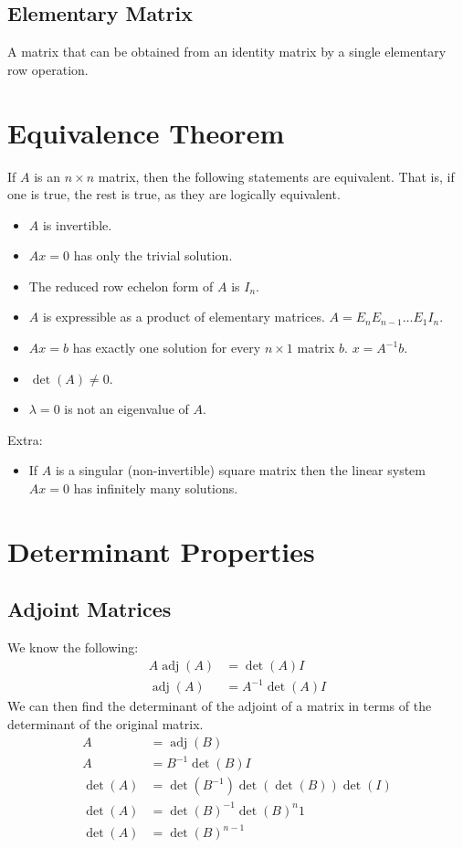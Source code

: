 \documentclass[12pt]{article}
\DeclareMathOperator{\adj}{adj}
\begin{document}
\subsection{Elementary Matrix}

A matrix that can be obtained from an identity matrix by a single elementary row operation.


\section{Equivalence Theorem}

If $A$ is an $n \times n$ matrix, then the following statements are equivalent. That is, if one is true, the rest is true, as they are logically equivalent.
\begin{itemize}
    \item $A$ is invertible.
    \item $Ax = 0$ has only the trivial solution.
    \item The reduced row echelon form of $A$ is $I_n$.
    \item $A$ is expressible as a product of elementary matrices. $A = E_nE_{n-1}\dots E_1I_n$.
    \item $Ax = b$ has exactly one solution for every $n \times 1$ matrix $b$. $x = A^{-1}b$.
    \item $\det(A) \neq 0$.
    \item $\lambda = 0$ is not an eigenvalue of $A$.
\end{itemize}
Extra:
\begin{itemize}
    \item If $A$ is a singular (non-invertible) square matrix then the linear system $Ax = 0$ has infinitely many solutions.
\end{itemize}


\section{Determinant Properties}


\subsection{Adjoint Matrices}

We know the following:
\begin{align*}
    A\adj(A) &= \det(A)I\\
    \adj(A) &= A^{-1}\det(A)I
\end{align*}
We can then find the determinant of the adjoint of a matrix in terms of the determinant of the original matrix.
\begin{align*}
    A &= \adj(B)\\
    A &= B^{-1}\det(B)I\\
    \det(A) &= \det(B^{-1}) \det(\det(B)) \det(I)\\
    \det(A) &= \det(B)^{-1} \det(B)^n 1\\
    \det(A) &= \det(B)^{n-1}
\end{align*}
\end{document}
